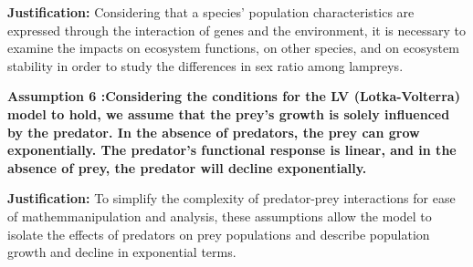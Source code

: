 \documentclass[CTeX = true]{mcmthesis}  %
\begin{document}
\textbf{Justification: }Considering that a species’ population characteristics are expressed through the interaction of genes and the environment, it is necessary to examine the impacts on ecosystem functions, on other species, and on ecosystem stability in order to study the differences in sex ratio among lampreys.

\textbf{Assumption 6 :Considering the conditions for the LV (Lotka-Volterra) model to hold, we assume that the prey's growth is solely influenced by the predator. In the absence of predators, the prey can grow exponentially. The predator's functional response is linear, and in the absence of prey, the predator will decline exponentially.
}

\textbf{Justification: }To simplify the complexity of predator-prey interactions for ease of mathem\newpageal manipulation and analysis, these assumptions allow the model to isolate the effects of predators on prey populations and describe population growth and decline in exponential terms.

\newpage
\end{document}
